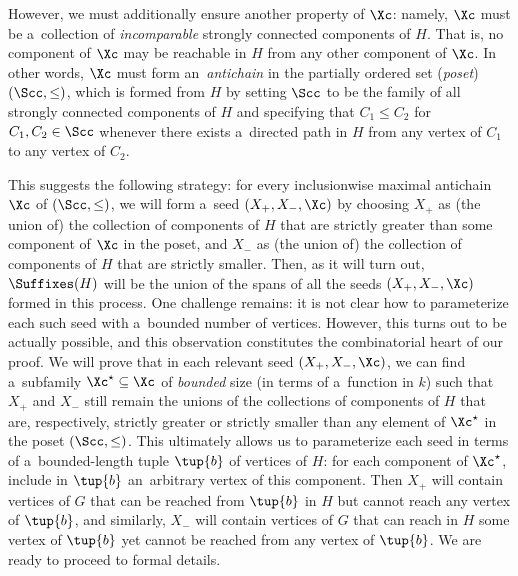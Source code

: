 However, we must additionally ensure another property of $\Xc$: namely, $\Xc$ must be a~collection of \emph{incomparable} strongly connected components of $H$.
That is, no component of $\Xc$ may be reachable in $H$ from any other component of $\Xc$.
In other words, $\Xc$ must form an~\emph{antichain} in the partially ordered set (\emph{poset}) $(\Scc, \leq)$, which is formed from $H$ by setting $\Scc$ to be the family of all strongly connected components of $H$ and specifying that $C_1 \leq C_2$ for $C_1, C_2 \in \Scc$ whenever there exists a~directed path in $H$ from any vertex of $C_1$ to any vertex of $C_2$.

This suggests the following strategy: for every inclusionwise maximal antichain $\Xc$ of $(\Scc, \leq)$, we will form a~seed $(X_+, X_-, \Xc)$ by choosing $X_+$ as (the union of) the collection of components of $H$ that are strictly greater than some component of $\Xc$ in the poset, and $X_-$ as (the union of) the collection of components of $H$ that are strictly smaller.
Then, as it will turn out, $\Suffixes(H)$ will be the union of the spans of all the seeds $(X_+, X_-, \Xc)$ formed in this process.
One challenge remains: it is not clear how to parameterize each such seed  with a~bounded number of vertices.
However, this turns out to be actually possible, and this observation constitutes the combinatorial heart of our proof. We will prove that in each relevant seed $(X_+, X_-, \Xc)$, we can find a~subfamily $\Xc^\star \subseteq \Xc$ of \emph{bounded} size (in terms of a~function in $k$) such that $X_+$ and $X_-$ still remain the unions of the collections of components of $H$ that are, respectively, strictly greater or strictly smaller than any element of $\Xc^\star$ in the poset $(\Scc, \leq)$.
This ultimately allows us to parameterize each seed in terms of a~bounded-length tuple $\tup{b}$ of vertices of $H$: for each component of $\Xc^\star$, include in $\tup{b}$ an~arbitrary vertex of this component.
Then $X_+$ will contain vertices of $G$ that can be reached from $\tup{b}$ in $H$ but cannot reach any vertex of $\tup{b}$, and similarly, $X_-$ will contain vertices of $G$ that can reach in $H$ some vertex of $\tup{b}$ yet cannot be reached from any vertex of $\tup{b}$.
We are ready to proceed to formal details.

\newcommand{\IsConsistent}{\mathsf{Consistent}}

